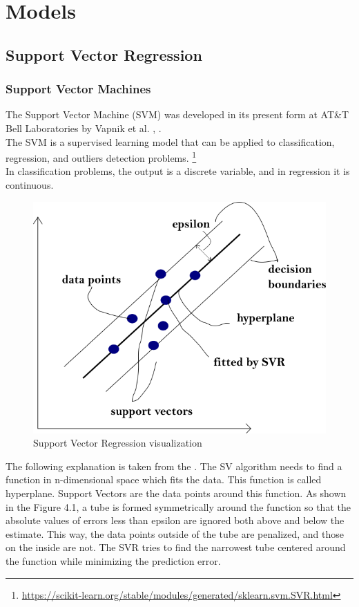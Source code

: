 \documentclass[times, utf8, zavrsni, english]{fer}
\begin{document}
\chapter{Models}

\section{Support Vector Regression}
\subsection{Support Vector Machines}
The Support Vector Machine (SVM) was developed in its present form at AT\&T Bell Laboratories by Vapnik et al. \citep{boser}, \citep{smola}. \\
The SVM is a supervised learning model that can be applied to classification, regression, and outliers detection problems. \footnote{\url{https://scikit-learn.org/stable/modules/generated/sklearn.svm.SVR.html}} \\
In classification problems, the output is a discrete variable, and in regression it is continuous. \\

\begin{figure}[h!]
	\centering
	\includegraphics[scale = 0.5]{svm-visualization}
	\caption{Support Vector Regression visualization}
\end{figure}

\noindent The following explanation is taken from the \citep{Awad2015}.
The SV algorithm needs to find a function in n-dimensional space which fits the data. This function is called hyperplane.
Support Vectors are the data points around this function. As shown in the Figure 4.1, a tube is formed symmetrically around the function so that the absolute values of errors less than epsilon are ignored both above and below the estimate. This way, the data points outside of the tube are penalized, and those on the inside are not.
The SVR tries to find the narrowest tube centered around the function while minimizing the prediction error.  \\
\end{document}
